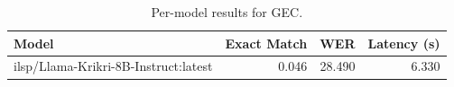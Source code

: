\begin{table}[t]
\centering
\caption{Per-model results for GEC.}
\label{tab:appendix-gec-analysis}
\begin{tabular}{lrrr}
\toprule
Model & Exact Match & WER & Latency (s) \\
\midrule
ilsp/Llama-Krikri-8B-Instruct:latest & 0.046 & 28.490 & 6.330 \\
\bottomrule
\end{tabular}
\end{table}
